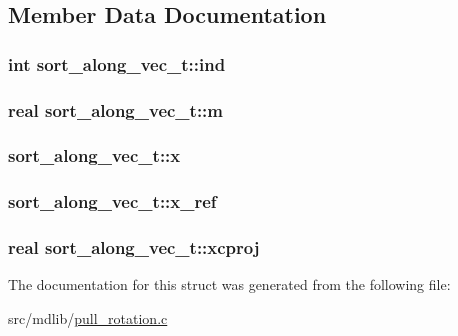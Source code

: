 \subsection{\-Member \-Data \-Documentation}
\hypertarget{structsort__along__vec__t_acc2114a84371fd229441cb872946c2d9}{
\subsubsection[{ind}]{\setlength{\rightskip}{0pt plus 5cm}int {\bf sort\-\_\-along\-\_\-vec\-\_\-t\-::ind}}}\label{structsort__along__vec__t_acc2114a84371fd229441cb872946c2d9}
\hypertarget{structsort__along__vec__t_aecb90bf8817b54c915a447f80d929425}{
\subsubsection[{m}]{\setlength{\rightskip}{0pt plus 5cm}real {\bf sort\-\_\-along\-\_\-vec\-\_\-t\-::m}}}\label{structsort__along__vec__t_aecb90bf8817b54c915a447f80d929425}
\hypertarget{structsort__along__vec__t_af435d3f46bbd4fd8c3726389e71f27e5}{
\subsubsection[{x}]{ {\bf sort\-\_\-along\-\_\-vec\-\_\-t\-::x}}}\label{structsort__along__vec__t_af435d3f46bbd4fd8c3726389e71f27e5}
\hypertarget{structsort__along__vec__t_a238bbc07e5a38f9c0229d404ab5a32ee}{
\subsubsection[{x\-\_\-ref}]{ {\bf sort\-\_\-along\-\_\-vec\-\_\-t\-::x\-\_\-ref}}}\label{structsort__along__vec__t_a238bbc07e5a38f9c0229d404ab5a32ee}
\hypertarget{structsort__along__vec__t_a03348aff3d15b29fdc76a34ec5f9ea5e}{
\subsubsection[{xcproj}]{\setlength{\rightskip}{0pt plus 5cm}real {\bf sort\-\_\-along\-\_\-vec\-\_\-t\-::xcproj}}}\label{structsort__along__vec__t_a03348aff3d15b29fdc76a34ec5f9ea5e}


\-The documentation for this struct was generated from the following file\-:\begin{DoxyCompactItemize}
\item 
src/mdlib/\hyperlink{pull__rotation_8c}{pull\-\_\-rotation.\-c}\end{DoxyCompactItemize}
